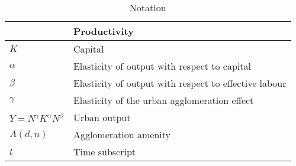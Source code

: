 \newpage
\begin{longtable}{lp{10cm}}
\caption{Notation}                \\


\hline    &  \textbf{Productivity} \\ \hline
$K$       &  Capital               \\
$\alpha$  &  Elasticity of output with respect to capital          \\
$\beta$   &  Elasticity of output with respect to effective labour \\
$\gamma$  &  Elasticity of the urban agglomeration effect          \\ %
$Y=N^\gamma K^{\alpha }N^{\beta }$  &  Urban output                \\
$A(d, n)$   &  Agglomeration amenity   \\
$t$         &  Time subscript          \\



\end{longtable}
